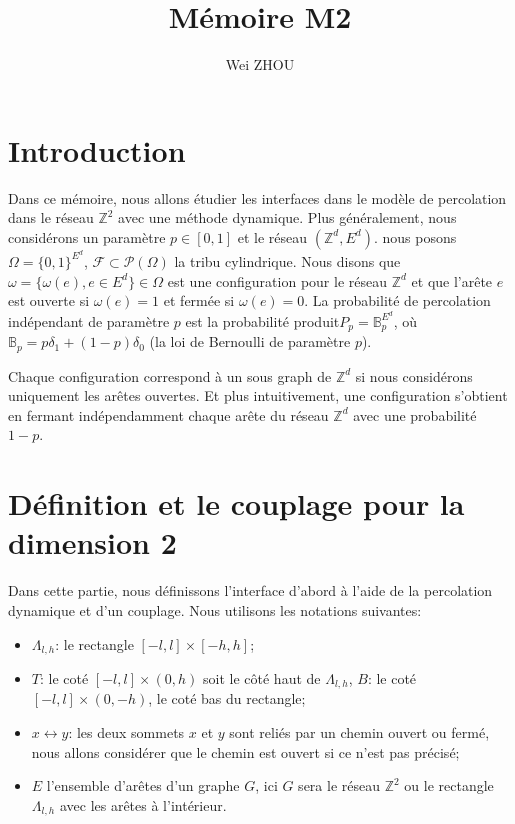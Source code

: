 \documentclass[titlepage,a4paper,12pt]{article}
\title{Mémoire M2}
\author{Wei ZHOU}
\newcounter{cor}
\begin{document}
\maketitle

\section{Introduction}
Dans ce mémoire, nous allons étudier les interfaces dans le modèle de percolation dans le réseau $\mathbb{Z}^2$ avec une méthode dynamique. Plus généralement, nous considérons un paramètre $p\in [0,1]$ et le réseau $(\mathbb{Z}^d,E^d)$. nous posons $\Omega = \{0,1\}^{E^d}$, $\mathcal{F}\subset \mathcal{P}(\Omega)$ la tribu cylindrique. Nous disons que $\omega = \{\omega(e), e\in E^d\} \in \Omega$ est une configuration pour le réseau $\mathbb{Z}^d$ et que l'arête $e$ est ouverte si $\omega(e) = 1$ et fermée si $\omega(e)= 0$. La probabilité de percolation indépendant de paramètre $p$ est la probabilité produit$P_p = \mathbb{B}_p^{E^d}$, où $\mathbb{B}_p = p\delta_1 +(1-p)\delta_0 $ (la loi de Bernoulli de paramètre $p$).

Chaque configuration correspond à un sous graph de $\mathbb{Z}^d$ si nous considérons uniquement les arêtes ouvertes. Et plus intuitivement, une configuration s'obtient en fermant indépendamment chaque arête du réseau $\mathbb{Z}^d$ avec une probabilité $1-p$. 

\section{Définition et le couplage pour la dimension 2}
Dans cette partie, nous définissons l'interface d'abord à l'aide de la percolation dynamique et d'un couplage. Nous utilisons les notations suivantes:
\begin{itemize}
\item $\Lambda_{l,h}$: le rectangle $[-l,l]\times[-h,h]$;
\item $T$: le coté $[-l,l]\times(0,h)$ soit le côté haut de $\Lambda_{l,h}$, $B$: le coté $[-l,l]\times(0,-h)$, le coté bas du rectangle;
\item $x\leftrightarrow y$: les deux sommets $x$ et $y$ sont reliés par un chemin ouvert ou fermé, nous allons considérer que le chemin est ouvert si ce n'est pas précisé;
\item $E$ l'ensemble d'arêtes d'un graphe $G$, ici $G$ sera le réseau $\mathbb{Z}^2$ ou le rectangle $\Lambda_{l,h}$ avec les arêtes à l'intérieur.
\end{itemize}
\end{document}
